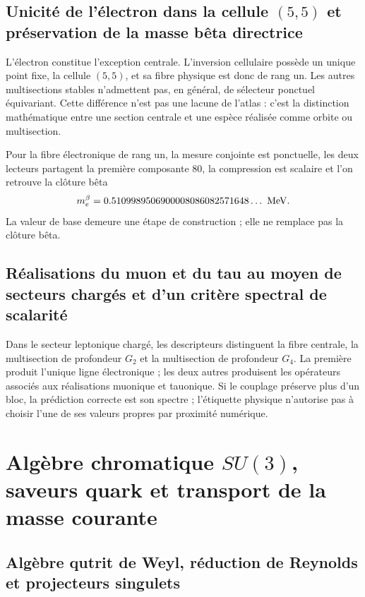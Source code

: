 \subsection{Unicité de l'électron dans la cellule \texorpdfstring{\((5,5)\)}{(5,5)} et préservation de la masse bêta directrice}

L'électron constitue l'exception centrale. L'inversion cellulaire possède un
unique point fixe, la cellule \((5,5)\), et sa fibre physique est donc de rang
un. Les autres multisections stables n'admettent pas, en général, de sélecteur
ponctuel équivariant. Cette différence n'est pas une lacune de l'atlas : c'est la
distinction mathématique entre une section centrale et une espèce réalisée comme
orbite ou multisection.

Pour la fibre électronique de rang un, la mesure conjointe est ponctuelle, les deux
lecteurs partagent la première composante \(80\), la compression est scalaire et l'on
retrouve la clôture bêta
\[
 m_e^\beta
 =0.5109989506900008086082571648\ldots\ {\rm MeV}.
\]
La valeur de base demeure une étape de construction ; elle ne remplace pas la clôture
bêta.

\subsection{Réalisations du muon et du tau au moyen de secteurs chargés et d'un critère spectral de scalarité}

Dans le secteur leptonique chargé, les descripteurs distinguent la fibre centrale,
la multisection de profondeur \(G_2\) et la multisection de profondeur
\(G_4\). La première produit l'unique ligne électronique ; les deux autres
produisent les opérateurs associés aux réalisations muonique et tauonique. Si
le couplage préserve plus d'un bloc, la prédiction correcte est son
spectre ; l'étiquette physique n'autorise pas à choisir l'une de ses valeurs propres par
proximité numérique.

\section{Algèbre chromatique \texorpdfstring{\(SU(3)\)}{SU(3)}, saveurs quark et transport de la masse courante}

\subsection{Algèbre qutrit de Weyl, réduction de Reynolds et projecteurs singulets}

